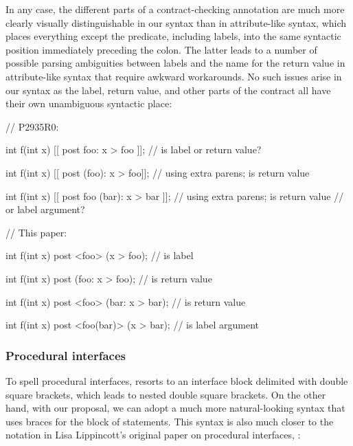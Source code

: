 In any case, the different parts of a contract-checking annotation are much more clearly visually distinguishable in our syntax than in attribute-like syntax, which places everything except the predicate, including labels, into the same syntactic position immediately preceding the colon. The latter leads to a number of possible parsing ambiguities between labels and the name for the return value in attribute-like syntax that require awkward workarounds. No such issues arise in our syntax as the label, return value, and other parts of the contract all have their own unambiguous syntactic place:

\begin{minipage}[t]{8cm}
\begin{codeblock}
// P2935R0:

int f(int x)
  [[ post foo: x > foo ]];  
  // is  label or return value?

int f(int x)
  [[ post (foo): x > foo]];  
  // using extra parens;  is return value

int f(int x)
  [[ post foo (bar): x > bar ]];  
  // using extra parens; is  return value
  // or label argument?
\end{codeblock}
\end{minipage}
\begin{minipage}[t]{8cm}
\begin{codeblock}
// This paper:

int f(int x)
  post <foo> (x > foo);
  //  is label

int f(int x)
  post (foo: x > foo);
  //  is return value

int f(int x)
  post <foo> (bar: x > bar); 
  //   is return value

int f(int x)
  post <foo(bar)> (x > bar);
  //  is label argument
\end{codeblock}
\end{minipage}

\subsubsection{Procedural interfaces}
\label{subsubsec:comp_interfaces}

To spell procedural interfaces, \cite{P2935R0} resorts to an interface block delimited with double square brackets, which leads to nested double square brackets. On the other hand, with our proposal, we can adopt a much more natural-looking syntax that uses braces for the block of statements. This syntax is also much closer to the notation in Lisa Lippincott's original paper on procedural interfaces, \cite{P0465R0}:
\vspace{5mm}

